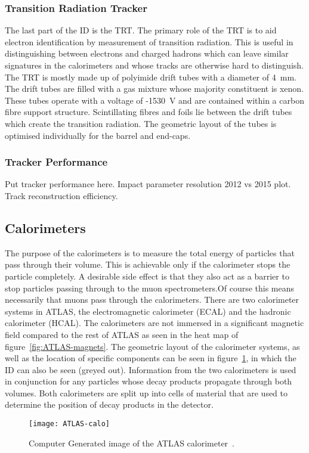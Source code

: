 \subsubsection{Transition Radiation Tracker}

The last part of the ID is the TRT. The primary role of the TRT is to aid
electron identification by measurement of transition radiation. This is useful
in distinguishing between electrons and charged hadrons which can leave similar
signatures in the calorimeters and whose tracks are otherwise hard to
distinguish. The TRT is mostly made up of polyimide drift tubes with a diameter
of 4~mm. The drift tubes are filled with a gas mixture whose majority
constituent is xenon. These tubes operate with a voltage of -1530~V and are
contained within a carbon fibre support structure. Scintillating fibres and
foils lie between the drift tubes which create the transition radiation.  The
geometric layout of the tubes is optimised individually for the barrel and
end-caps.

\subsubsection{Tracker Performance}
Put tracker performance here. Impact parameter resolution 2012 vs 2015 plot.
Track reconstruction efficiency.

\subsection{Calorimeters}%
\label{sec:calo}

The purpose of the calorimeters is to measure the total energy of particles that
pass through their volume. This is achievable only if the calorimeter stops the
particle completely. A desirable side effect is that they also act as a barrier
to stop particles passing through to the muon spectrometers.Of course this
means necessarily that muons pass through the calorimeters. There are two
calorimeter systems in ATLAS, the electromagnetic calorimeter (ECAL) and the
hadronic calorimeter (HCAL). The calorimeters are not immersed in a significant
magnetic field compared to the rest of ATLAS as seen in the heat map of
figure~\ref{fig:ATLAS-magnets}. The geometric layout of the calorimeter systems,
as well as the location of specific components can be seen in
figure~\ref{fig:ATLAS-calo}, in which the ID can also be seen (greyed out).
Information from the two calorimeters is used in conjunction for any particles
whose decay products propagate through both volumes. Both calorimeters are split
up into cells of material that are used to determine the position of decay
products in the detector.
\begin{figure}[ht] \centering \texttt{[image: ATLAS-calo]}
  \caption[ATLAS Calorimeter]{Computer Generated image of the ATLAS
calorimeter~\cite{ATLAS-calo-fig}.}%
  \label{fig:ATLAS-calo}
\end{figure}

